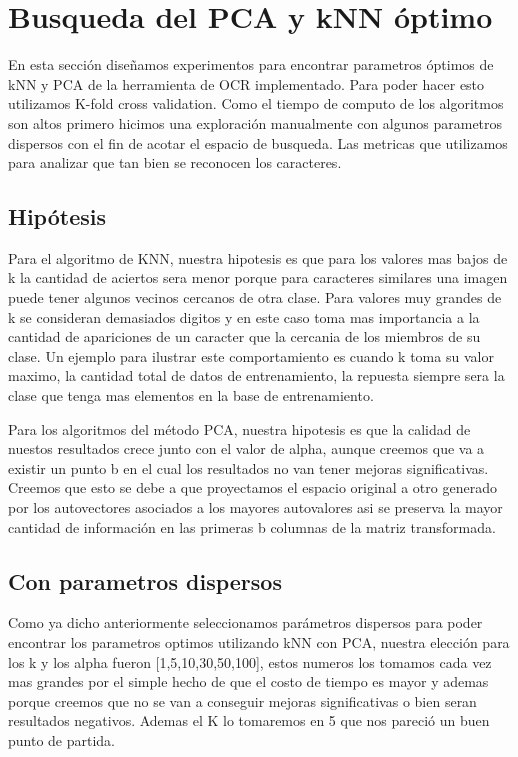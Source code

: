 
\section{Busqueda del PCA y kNN óptimo}

En esta sección diseñamos experimentos para encontrar parametros óptimos  de kNN y PCA de la herramienta de OCR implementado. Para poder hacer esto utilizamos K-fold cross validation.
Como el tiempo de computo de los algoritmos son altos primero hicimos una exploración manualmente con algunos parametros dispersos con el fin de acotar el espacio de busqueda. Las metricas que utilizamos para analizar que tan bien se reconocen los caracteres.



\subsection{Hipótesis}
Para el algoritmo de KNN, nuestra hipotesis es que para los valores mas bajos de k la cantidad de aciertos sera menor porque para caracteres similares una imagen puede tener algunos vecinos cercanos de otra clase. Para valores muy grandes de k se consideran demasiados digitos y en este caso toma mas importancia a la cantidad de apariciones de un caracter que la cercania de los miembros de su clase. Un ejemplo para ilustrar este comportamiento es cuando k toma su valor maximo, la cantidad total de datos de entrenamiento, la repuesta siempre sera la clase que tenga mas elementos en la base de entrenamiento.

Para los algoritmos del método PCA, nuestra hipotesis es que la calidad de nuestos resultados crece junto con el valor de alpha, aunque creemos que va a existir un punto b en el cual los resultados no van tener mejoras significativas. Creemos que esto se debe a que proyectamos el espacio original a otro generado por los autovectores asociados a los mayores autovalores asi se preserva la mayor cantidad de información en las primeras b columnas de la matriz transformada.

\subsection{Con parametros dispersos}

Como ya dicho anteriormente seleccionamos parámetros dispersos para poder encontrar los parametros optimos utilizando kNN con PCA, nuestra elección para los k y los alpha fueron [1,5,10,30,50,100], estos numeros los tomamos cada vez mas grandes por el simple hecho de que el costo de tiempo es mayor y ademas porque creemos que no se van a conseguir mejoras significativas o bien seran resultados negativos. Ademas el K lo tomaremos en 5 que nos pareció un buen punto de partida.

